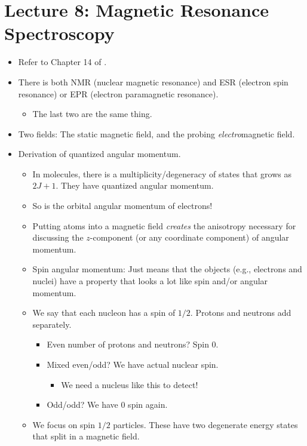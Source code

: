 \documentclass[../notes.tex]{subfiles}
\begin{document}
\section{Lecture 8: Magnetic Resonance Spectroscopy}
\begin{itemize}
    \item {}Refer to Chapter 14 of \textcite{bib:McQuarrieSimon}.
    \item There is both NMR (nuclear magnetic resonance) and ESR (electron spin resonance) or EPR (electron paramagnetic resonance).
    \begin{itemize}
        \item The last two are the same thing.
    \end{itemize}
    \item Two fields: The static magnetic field, and the probing \emph{electro}magnetic field.
    \item Derivation of quantized angular momentum.
    \begin{itemize}
        \item In molecules, there is a multiplicity/degeneracy of states that grows as $2J+1$. They have quantized angular momentum.
        \item So is the orbital angular momentum of electrons!
        \item Putting atoms into a magnetic field \emph{creates} the anisotropy necessary for discussing the $z$-component (or any coordinate component) of angular momentum.
        \item Spin angular momentum: Just means that the objects (e.g., electrons and nuclei) have a property that looks a lot like spin and/or angular momentum.
        \item We say that each nucleon has a spin of $1/2$. Protons and neutrons add separately.
        \begin{itemize}
            \item Even number of protons and neutrons? Spin 0.
            \item Mixed even/odd? We have actual nuclear spin.
            \begin{itemize}
                \item We need a nucleus like this to detect!
            \end{itemize}
            \item Odd/odd? We have 0 spin again.
        \end{itemize}
        \item We focus on spin $1/2$ particles. These have two degenerate energy states that split in a magnetic field.

\end{itemize}
\end{itemize}
\end{document}

